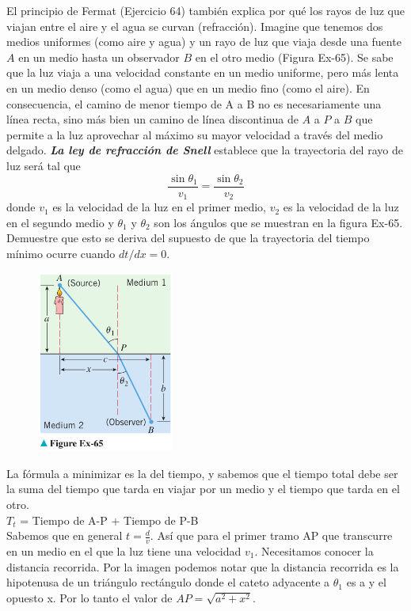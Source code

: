 \documentclass[12pt]{article}
\begin{document}
El principio de Fermat (Ejercicio 64) también explica por qué los rayos de luz que viajan entre el aire y el agua se curvan (refracción). Imagine que tenemos dos medios uniformes (como aire y agua) y un rayo de luz que viaja desde una fuente $A$ en un medio hasta un observador $B$ en el otro medio (Figura Ex-65). Se sabe que la luz viaja a una velocidad constante en un medio uniforme, pero más lenta en un medio denso (como el agua) que en un medio fino (como el aire). En consecuencia, el camino de menor tiempo de A a B no es necesariamente una línea recta, sino más bien un camino de línea discontinua de $A$ a $P$ a $B$ que permite a la luz aprovechar al máximo su mayor velocidad a través del medio delgado. \textit{\textbf{La ley de refracción de Snell}} establece que la trayectoria del rayo de luz será tal que
\[
\frac{\sin{\theta_1}}{v_1}=\frac{\sin{\theta_2}}{v_2}
\]
donde $v_1$ es la velocidad de la luz en el primer medio, $v_2$ es la velocidad de la luz en el segundo medio y $\theta_1$ y $\theta_2$ son los ángulos que se muestran en la figura Ex-65. Demuestre que esto se deriva del supuesto de que la trayectoria del tiempo mínimo ocurre cuando $dt /dx = 0$.\\
\begin{figure}[H]
\centering
\includegraphics[width=0.4\textwidth]{../img/img_Lista3/3_65.png}
\end{figure}
La fórmula a minimizar es la del tiempo, y sabemos que el tiempo total debe ser la suma del tiempo que tarda en viajar por un medio y el tiempo que tarda en el otro. \\
$T_t$ = Tiempo de A-P + Tiempo de P-B\\
Sabemos que en general $t = \frac{d}{v}$.
Así que para el primer tramo AP que transcurre en un medio en el que la luz tiene una velocidad $v_1$. Necesitamos conocer la distancia recorrida. Por la imagen podemos notar que la distancia recorrida es la hipotenusa de un triángulo rectángulo donde el cateto adyacente a $\theta_1$ es a y el opuesto x. Por lo tanto el valor de $AP= \sqrt{a^2+x^2}$. 
\end{document}
